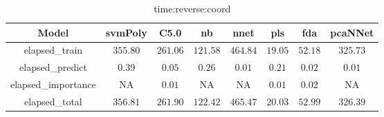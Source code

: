 \begin{table}[!ht]
	\centering
	\begin{tabular}{|c|c|c|c|c|c|c|c|}
		\hline
		Model & svmPoly & C5.0 & nb & nnet & pls & fda & pcaNNet \\ \hline
		elapsed_train & $355.80$ & $261.06$ & $121.58$ & $464.84$ & $19.05$ & $52.18$ & $325.73$ \\ \hline
		elapsed_predict & $0.39$ & $0.05$ & $0.26$ & $0.01$ & $0.21$ & $0.02$ & $0.01$ \\ \hline
		elapsed_importance & NA & $0.01$ & NA & NA & $0.01$ & $0.02$ & NA \\ \hline
		elapsed_total & $356.81$ & $261.90$ & $122.42$ & $465.47$ & $20.03$ & $52.99$ & $326.39$ \\ \hline
	\end{tabular}
	\caption{time:reverse:coord}
	\label{tab:time:reverse:coord}
\end{table}
